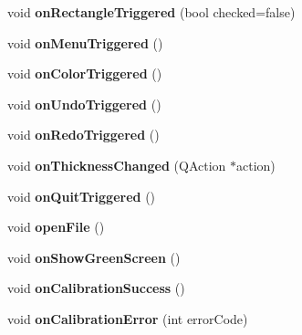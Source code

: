 \begin{DoxyCompactItemize}
\item 
\hypertarget{classMainWindow_ab539b0cb9b3e15b50feb65184ccd4cc0}{}void {\bfseries on\+Rectangle\+Triggered} (bool checked=false)\label{classMainWindow_ab539b0cb9b3e15b50feb65184ccd4cc0}

\item 
\hypertarget{classMainWindow_af1562ae519cea3dbc2fd3eb3d1c31b69}{}void {\bfseries on\+Menu\+Triggered} ()\label{classMainWindow_af1562ae519cea3dbc2fd3eb3d1c31b69}

\item 
\hypertarget{classMainWindow_a25895d1a082d52c0302368aeb0f2702b}{}void {\bfseries on\+Color\+Triggered} ()\label{classMainWindow_a25895d1a082d52c0302368aeb0f2702b}

\item 
\hypertarget{classMainWindow_aa17c4b726dc0efdd3d2b730629d8fbb8}{}void {\bfseries on\+Undo\+Triggered} ()\label{classMainWindow_aa17c4b726dc0efdd3d2b730629d8fbb8}

\item 
\hypertarget{classMainWindow_a1439657ac38bc4ee4ab734658fdb6690}{}void {\bfseries on\+Redo\+Triggered} ()\label{classMainWindow_a1439657ac38bc4ee4ab734658fdb6690}

\item 
\hypertarget{classMainWindow_ae33762181ff24c4d56d8080c647882e0}{}void {\bfseries on\+Thickness\+Changed} (Q\+Action $\ast$action)\label{classMainWindow_ae33762181ff24c4d56d8080c647882e0}

\item 
\hypertarget{classMainWindow_a52948c392f1a5865d78a90c77e3d1920}{}void {\bfseries on\+Quit\+Triggered} ()\label{classMainWindow_a52948c392f1a5865d78a90c77e3d1920}

\item 
\hypertarget{classMainWindow_a288b768c3c21a9171bdc56fe845ece8b}{}void {\bfseries open\+File} ()\label{classMainWindow_a288b768c3c21a9171bdc56fe845ece8b}

\item 
\hypertarget{classMainWindow_ac3a4c91c59875652b5873c294f2f549b}{}void {\bfseries on\+Show\+Green\+Screen} ()\label{classMainWindow_ac3a4c91c59875652b5873c294f2f549b}

\item 
\hypertarget{classMainWindow_ae173f696797fb626c57da829361afb82}{}void {\bfseries on\+Calibration\+Success} ()\label{classMainWindow_ae173f696797fb626c57da829361afb82}

\item 
\hypertarget{classMainWindow_a50cef01c48e9bd998bef3911cdb48afd}{}void {\bfseries on\+Calibration\+Error} (int error\+Code)\label{classMainWindow_a50cef01c48e9bd998bef3911cdb48afd}


\end{DoxyCompactItemize}
